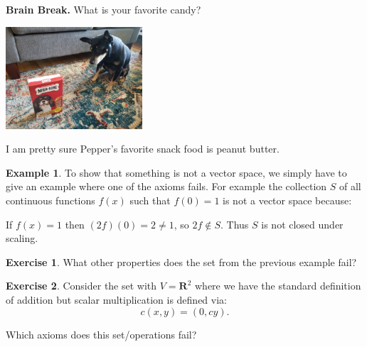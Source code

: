 \documentclass{beamer}
\newcommand{\R}{\mathbf{R}}
\newcommand{\fn}{\insertframenumber}
\theoremstyle{definition}
\newtheorem{exercise}{Exercise}
\newtheorem*{exa}{Example}
\begin{document}
\begin{frame}{\fn}
	\begin{block}{\textbf{Brain Break.}}
		What is your favorite candy?
		\begin{center}
			\includegraphics[width=2in]{../images/treat_Pepper}
		\end{center}
		I am pretty sure Pepper's favorite snack food is peanut butter.
	\end{block}
\end{frame}
\begin{frame}{\fn}
	\begin{exa}
		To show that something is not a vector space, we simply have to give an example where one of the axioms fails.  For example the collection $S$ of all continuous functions $f(x)$ such that $f(0)=1$ is not a vector space because:
		
			\begin{center}
				\begin{minipage}{.8\textwidth}
					If $f(x)=1$ then $(2f)(0)=2\neq1$, so $2f\not\in S $. Thus $S$ is not closed under scaling.\hfill\qedsymbol
				\end{minipage}
			\end{center} 
	\end{exa}
	\begin{exercise}
		What other properties does the set from the previous example fail?
	\end{exercise}
\end{frame}
\begin{frame}{\fn}
	\begin{exercise}
		Consider the set with $V=\R^2$ where we have the standard definition of addition but scalar multiplication is defined via:\[c(x,y)=(0,cy).\]
		
		Which axioms does this set/operations fail?
	\end{exercise}
\end{frame}
\end{document}
